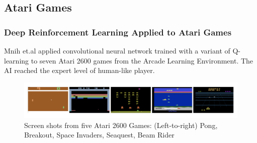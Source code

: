 \documentclass{beamer}
\begin{document}
\subsection{Atari Games}
\begin{frame}
  \frametitle{Deep Reinforcement Learning Applied to Atari Games}
  Mnih et.al \cite{13} applied convolutional neural network trained with a variant of Q-learning to seven Atari 2600 games from the Arcade Learning Environment. The AI reached the expert level of human-like player.
  \begin{figure}
    \includegraphics[width=1\linewidth]{figure/atari}
    \caption{  Screen shots from five Atari 2600 Games: (Left-to-right) Pong, Breakout, Space Invaders, Seaquest, Beam Rider}
  \end{figure}
\end{frame}



\end{document}
